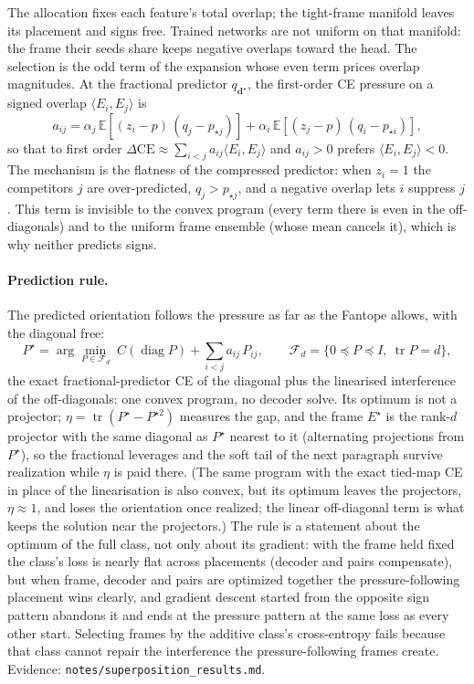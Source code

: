 The allocation fixes each feature's total overlap; the tight-frame manifold leaves
its placement and signs free. Trained networks are not uniform on that manifold:
the frame their seeds share keeps negative overlaps toward the head. The selection is
the odd term of the expansion whose even term prices overlap magnitudes. At the
fractional predictor \(q_{\mathbf d^\star}\), the first-order CE pressure on a signed
overlap \(\langle E_i,E_j\rangle\) is
\begin{equation}
\boxed{
a_{ij}
=
\alpha_j\,\mathbb E\!\left[(z_i-p)\,(q_j-p_{\star j})\right]
+
\alpha_i\,\mathbb E\!\left[(z_j-p)\,(q_i-p_{\star i})\right],
}
\label{eq:signed-pressure}
\end{equation}
so that to first order \(\Delta\mathrm{CE}\approx\sum_{i<j}a_{ij}\langle E_i,E_j\rangle\)
and \(a_{ij}>0\) prefers \(\langle E_i,E_j\rangle<0\). The mechanism is the flatness
of the compressed predictor: when \(z_i=1\) the competitors \(j\) are over-predicted,
\(q_j>p_{\star j}\), and a negative overlap lets \(i\) suppress \(j\). This term is
invisible to the convex program (every term there is even in the off-diagonals) and
to the uniform frame ensemble (whose mean cancels it), which is why neither predicts
signs.

\paragraph{Prediction rule.}
The predicted orientation follows the pressure as far as the Fantope allows, with the
diagonal free:
\begin{equation}
\boxed{
P^\star
=
\arg\min_{P\in\mathcal F_d}\;
C(\operatorname{diag}P)+\sum_{i<j}a_{ij}\,P_{ij},
\qquad
\mathcal F_d=\{0\preceq P\preceq I,\ \operatorname{tr}P=d\},
}
\label{eq:pressure-frame}
\end{equation}
the exact fractional-predictor CE of the diagonal plus the linearised interference of
the off-diagonals: one convex program, no decoder solve. Its optimum is not a
projector; \(\eta=\operatorname{tr}(P^\star-P^{\star2})\) measures the gap, and the
frame \(E^\star\) is the rank-\(d\) projector with the same diagonal as \(P^\star\)
nearest to it (alternating projections from \(P^\star\)), so the fractional leverages
and the soft tail of the next paragraph survive realization while \(\eta\) is paid
there. (The same program with the exact tied-map CE in place of the linearisation is
also convex, but its optimum leaves the projectors, \(\eta\approx1\), and loses the
orientation once realized; the linear off-diagonal term is what keeps the solution
near the projectors.) The rule is a statement about the optimum of the full class, not only
about its gradient: with the frame held fixed the class's loss is nearly flat across
placements (decoder and pairs compensate), but when frame, decoder and pairs are
optimized together the pressure-following placement wins clearly, and gradient
descent started from the opposite sign pattern abandons it and ends at the pressure
pattern at the same loss as every other start. Selecting frames by the
additive class's cross-entropy fails because that class cannot repair the
interference the pressure-following frames create. Evidence: \texttt{notes/superposition\_results.md}.

